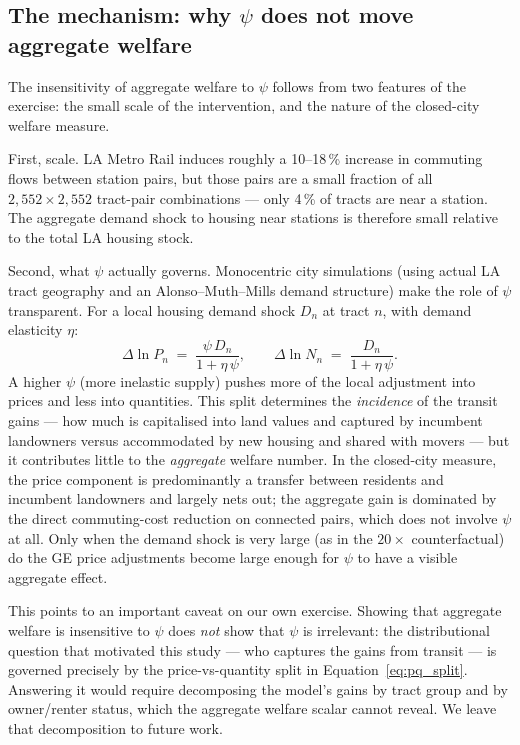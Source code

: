 \documentclass[12pt,a4paper]{article}
\begin{document}
\subsection{The mechanism: why $\psi$ does not move aggregate welfare}
\label{subsec:mechanism}

The insensitivity of aggregate welfare to $\psi$ follows from two features of
the exercise: the small scale of the intervention, and the nature of the
closed-city welfare measure.

First, scale.  LA Metro Rail induces roughly a 10--18\,\% increase in commuting
flows between station pairs, but those pairs are a small fraction of all
$2{,}552 \times 2{,}552$ tract-pair combinations --- only 4\,\% of tracts are
near a station.  The aggregate demand shock to housing near stations is
therefore small relative to the total LA housing stock.

Second, what $\psi$ actually governs.  Monocentric city simulations (using
actual LA tract geography and an Alonso--Muth--Mills demand structure) make the
role of $\psi$ transparent.  For a local housing demand shock $D_n$ at tract
$n$, with demand elasticity $\eta$:
%
\begin{equation}
  \Delta\ln P_n \;=\; \frac{\psi\,D_n}{1 + \eta\,\psi}, \qquad
  \Delta\ln N_n \;=\; \frac{D_n}{1 + \eta\,\psi}.
  \label{eq:pq_split}
\end{equation}
%
A higher $\psi$ (more inelastic supply) pushes more of the local adjustment into
prices and less into quantities.  This split determines the \emph{incidence} of
the transit gains --- how much is capitalised into land values and captured by
incumbent landowners versus accommodated by new housing and shared with movers
--- but it contributes little to the \emph{aggregate} welfare number.  In the
closed-city measure, the price component is predominantly a transfer between
residents and incumbent landowners and largely nets out; the aggregate gain is
dominated by the direct commuting-cost reduction on connected pairs, which does
not involve $\psi$ at all.  Only when the demand shock is very large (as in the
$20\times$ counterfactual) do the GE price adjustments become large enough for
$\psi$ to have a visible aggregate effect.

This points to an important caveat on our own exercise.  Showing that aggregate
welfare is insensitive to $\psi$ does \emph{not} show that $\psi$ is irrelevant:
the distributional question that motivated this study --- who captures the gains
from transit --- is governed precisely by the price-vs-quantity split in
Equation~\eqref{eq:pq_split}.  Answering it would require decomposing the
model's gains by tract group and by owner/renter status, which the aggregate
welfare scalar cannot reveal.  We leave that decomposition to future work.
\end{document}
